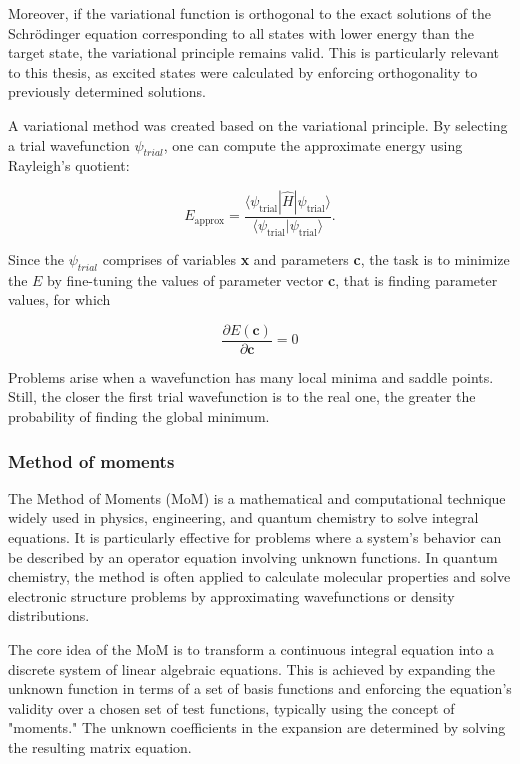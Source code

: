 Moreover, if the variational function is orthogonal to the exact solutions of the Schrödinger equation corresponding to all states with lower energy than the target state, the variational principle remains valid.\cite{ideas_of_qc} This is particularly relevant to this thesis, as excited states were calculated by enforcing orthogonality to previously determined solutions.

A variational method was created based on the variational principle. By selecting a trial wavefunction $\psi_{trial}$, one can compute the approximate energy using Rayleigh's quotient:

\begin{equation} E_{\text{approx}} = \frac{\langle \psi_{\text{trial}} | \hat{H} | \psi_{\text{trial}} \rangle}{\langle \psi_{\text{trial}} | \psi_{\text{trial}} \rangle}. \end{equation}

Since the $\psi_{trial}$ comprises of variables \textbf{x} and parameters \textbf{c}, the task is to minimize the $E$  by fine-tuning the values of parameter vector \textbf{c}, that is finding parameter values, for which\cite{IzaacWang2018ComputationalQM}


\begin{equation} 
	\frac{\partial E(\textbf{c})}{\partial \textbf{c}} = 0
\end{equation}

Problems arise when a wavefunction has many local minima and saddle points. Still, the closer the first trial wavefunction is to the real one, the greater the probability of finding the global minimum.

\subsubsection{Method of moments}

The Method of Moments (MoM) is a mathematical and computational technique widely used in physics, engineering, and quantum chemistry to solve integral equations. It is particularly effective for problems where a system’s behavior can be described by an operator equation involving unknown functions. In quantum chemistry, the method is often applied to calculate molecular properties and solve electronic structure problems by approximating wavefunctions or density distributions.

The core idea of the MoM is to transform a continuous integral equation into a discrete system of linear algebraic equations. This is achieved by expanding the unknown function in terms of a set of basis functions and enforcing the equation's validity over a chosen set of test functions, typically using the concept of "moments." The unknown coefficients in the expansion are determined by solving the resulting matrix equation.

